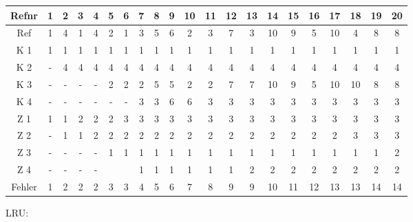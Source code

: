 \begin{enumerate}[a)]
\begin{note}
\begin{tabular}{|c||c|c|c|c|c|c|c|c|c|c|c|c|c|c|c|c|c|c|c|c|}
	\hline
	\rowcolor{lightgray} Refnr & 1 & 2 & 3 & 4 & 5 & 6 & 7 & 8 & 9 & 10 & 11 & 12 & 13 & 14 & 15 & 16 & 17 & 18 & 19 & 20 \\
	\hline
	\rowcolor{lightgray} Ref & 1 & 4 & 1 & 4 & 2 & 1 & 3 & 5 & 6 & 2 & 3 & 7 & 3 & 10 & 9 & 5 & 10 & 4 & 8 & 8 \\
	\hline \hline
	K 1 & \color{blue} 1 & 1 & \color{blue} 1 & 1 & 1 & \color{blue} 1 & 1 & 1 & 1 & 1 & 1 & 1 & 1 & 1 & 1 & 1 & 1 & 1 & 1 & 1 \\
	\hline
	K 2 & - & \color{blue} 4 & 4 & \color{blue} 4 & 4 & 4 & 4 & 4 & 4 & 4 & 4 & 4 & 4 & 4 & 4 & 4 & 4 & \color{blue} 4 & 4 & 4 \\
	\hline
	K 3 & - & - & - & - & \color{blue} 2 & 2 & 2 & \color{blue} 5 & 5 & \color{blue} 2 & 2 & \color{blue} 7 & 7 & \color{blue} 10 & \color{blue} 9 & \color{blue} 5 & \color{blue} 10 & 10 & \color{blue} 8 & \color{blue} 8 \\
	\hline
	K 4 & - & - & - & - & - & - & \color{blue} 3 & 3 & \color{blue} 6 & 6 & \color{blue} 3 & 3 & \color{blue} 3 & 3 & 3 & 3 & 3 & 3 & 3 & 3 \\
	\hline \hline
	\rowcolor{lightgray} Z 1 & \color{blue} 1 & 1 & \color{blue} 2 & 2 & 2 & \color{blue} 3 & 3 & 3 & 3 & 3 & 3 & 3 & 3 & 3 & 3 & 3 & 3 & 3 & 3 & 3 \\
	\hline
	\rowcolor{lightgray} Z 2 & - & \color{blue} 1 & 1 & \color{blue} 2 & 2 & 2 & 2 & 2 & 2 & 2 & 2 & 2 & 2 & 2 & 2 & 2 & 2 & \color{blue} 3 & 3 & 3 \\
	\hline
	\rowcolor{lightgray} Z 3 & - & - & - & - & \color{blue} 1 & 1 & 1 & \color{blue} 1 & 1 & \color{blue} 1 & 1 & \color{blue} 1 & 1 & \color{blue} 1 & \color{blue} 1 & \color{blue} 1 & \color{blue} 1 & 1 & \color{blue} 1 & \color{blue} 2 \\
	\hline
	\rowcolor{lightgray} Z 4 & - & - & - & - &  &  & \color{blue} 1 & 1 & \color{blue} 1 & 1 & \color{blue} 1 & 1 & \color{blue} 2 & 2 & 2 & 2 & 2 & 2 & 2 & 2 \\
	\hline \hline
	Fehler & 1 & 2 & 2 & 2 & 3 & 3 & 4 & 5 & 6 & 7 & 8 & 9 & 9 & 10 & 11 & 12 & 13 & 13 & 14 & 14 \\
	\hline
\end{tabular}

LRU:\nopagebreak


\end{note}
\end{enumerate}
